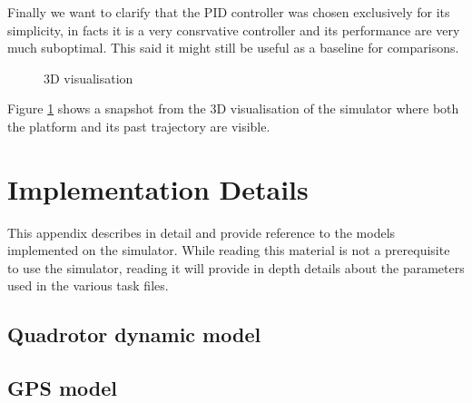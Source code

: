 \documentclass[a4paper,11pt]{report}
\begin{document}
Finally we want to clarify that the PID controller was chosen exclusively for its simplicity, in facts it is a very consrvative controller and its performance are very much suboptimal. This said it might still be useful as a baseline for comparisons. 

\begin{center}
\begin{figure}
\label{fig:3d}
 \caption{3D visualisation}
\end{figure}
\end{center}

Figure \ref{fig:3d} shows a snapshot from the 3D visualisation of the simulator where both the platform and its past trajectory are visible.


\appendix
\chapter{Implementation Details}

This appendix describes in detail and provide reference to the models implemented on the simulator.
While reading this material is not a prerequisite to use the simulator, reading it will provide in depth details about the parameters used in the various task files.

\section{Quadrotor dynamic model}


\section{GPS model}
\end{document}
